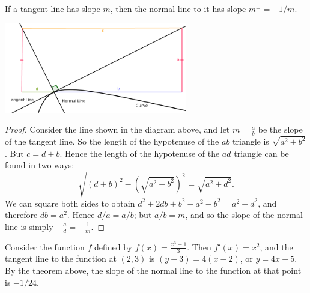 \begin{thm}
  If a tangent line has slope $ m $, then the normal line to it has slope $ m^\perp = -1/m $.
\end{thm}

\begin{center}
  \includegraphics[width=0.6\textwidth]{normal-line-proof}
\end{center}

\begin{proof}
  Consider the line shown in the diagram above, and let $ m = \frac{a}{b} $ be the slope of the tangent line.
  So the length of the hypotenuse of the $ ab $ triangle is $ \sqrt{a^2 + b^2} $. But $ c = d + b $. Hence the length
  of the hypotenuse of the $ ad $ triangle can be found in two ways:
  \begin{displaymath}
    \sqrt{(d + b)^2 - \left(\sqrt{a^2 + b^2}\right)^2} = \sqrt{a^2 + d^2}.
  \end{displaymath}
  We can square both sides to obtain $ d^2 + 2db + b^2 - a^2 - b^2 = a^2 + d^2 $, and therefore $ db = a^2 $.
  Hence $ d/a = a/b $; but $ a/b = m $, and so the slope of the normal line is simply $ -\frac{a}{d} = -\frac{1}{m} $.
\end{proof}

\begin{ex}
  Consider the function $ f $ defined by $ f(x) = \frac{x^3 + 1}{3} $. Then $ f'(x) = x^2 $, and the tangent line
  to the function at $ (2, 3) $ is $ (y - 3) = 4(x - 2) $, or $ y = 4x - 5 $. By the theorem above,
  the slope of the normal line to the function at that point is $ -1/24 $.

  \begin{center}
  \end{center}
\end{ex}

